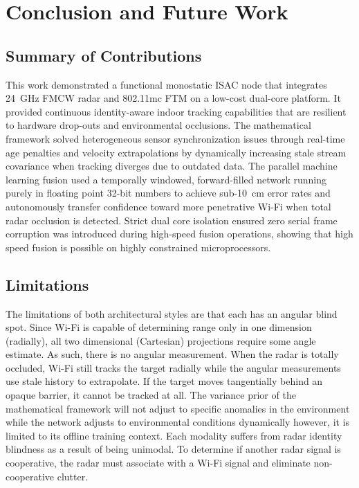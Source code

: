 \chapter{Conclusion and Future Work}
\label{chap:conclusion}

\section{Summary of Contributions}
\label{sec:contributions}

This work demonstrated a functional monostatic ISAC node that integrates 24~GHz FMCW radar and 802.11mc FTM on a low-cost dual-core platform. It provided continuous identity-aware indoor tracking capabilities that are resilient to hardware drop-outs and environmental occlusions. The mathematical framework solved heterogeneous sensor synchronization issues through real-time age penalties and velocity extrapolations by dynamically increasing stale stream covariance when tracking diverges due to outdated data. The parallel machine learning fusion used a temporally windowed, forward-filled network running purely in floating point 32-bit numbers to achieve sub-10~cm error rates and autonomously transfer confidence toward more penetrative Wi-Fi when total radar occlusion is detected. Strict dual core isolation ensured zero serial frame corruption was introduced during high-speed fusion operations, showing that high speed fusion is possible on highly constrained microprocessors.

\section{Limitations}
\label{sec:limitations}

The limitations of both architectural styles are that each has an angular blind spot. Since Wi-Fi is capable of determining range only in one dimension (radially), all two dimensional (Cartesian) projections require some angle estimate. As such, there is no angular measurement. When the radar is totally occluded, Wi-Fi still tracks the target radially while the angular measurements use stale history to extrapolate. If the target moves tangentially behind an opaque barrier, it cannot be tracked at all. The variance prior of the mathematical framework will not adjust to specific anomalies in the environment while the network adjusts to environmental conditions dynamically however, it is limited to its offline training context. Each modality suffers from radar identity blindness as a result of being unimodal. To determine if another radar signal is cooperative, the radar must associate with a Wi-Fi signal and eliminate non-cooperative clutter.

